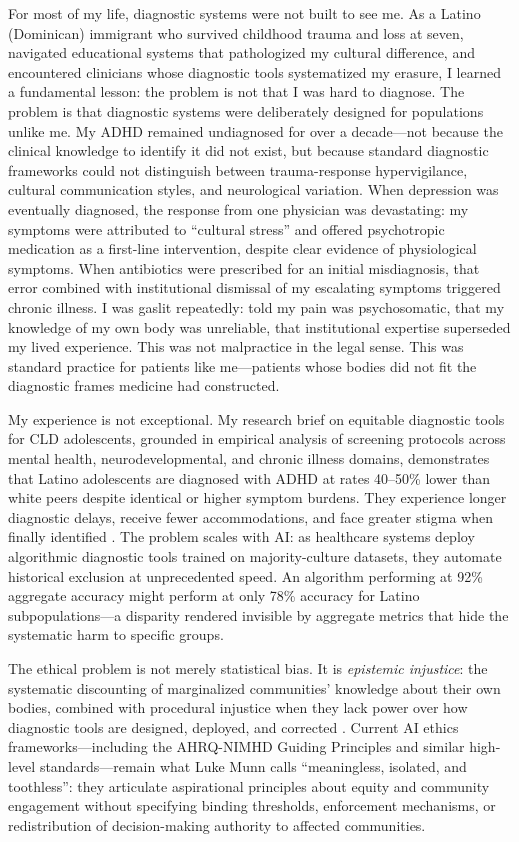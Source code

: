 \documentclass[12pt,a4paper]{article}
\begin{document}
\noindent For most of my life, diagnostic systems were not built to see me. As a Latino (Dominican) immigrant who survived childhood trauma and loss at seven, navigated educational systems that pathologized my cultural difference, and encountered clinicians whose diagnostic tools systematized my erasure, I learned a fundamental lesson: the problem is not that I was hard to diagnose. The problem is that diagnostic systems were deliberately designed for populations unlike me. My ADHD remained undiagnosed for over a decade—not because the clinical knowledge to identify it did not exist, but because standard diagnostic frameworks could not distinguish between trauma-response hypervigilance, cultural communication styles, and neurological variation. When depression was eventually diagnosed, the response from one physician was devastating: my symptoms were attributed to ``cultural stress'' and offered psychotropic medication as a first-line intervention, despite clear evidence of physiological symptoms. When antibiotics were prescribed for an initial misdiagnosis, that error combined with institutional dismissal of my escalating symptoms triggered chronic illness. I was gaslit repeatedly: told my pain was psychosomatic, that my knowledge of my own body was unreliable, that institutional expertise superseded my lived experience. This was not malpractice in the legal sense. This was standard practice for patients like me—patients whose bodies did not fit the diagnostic frames medicine had constructed.

My experience is not exceptional. My research brief on equitable diagnostic tools for CLD adolescents, grounded in empirical analysis of screening protocols across mental health, neurodevelopmental, and chronic illness domains, demonstrates that Latino adolescents are diagnosed with ADHD at rates 40--50\% lower than white peers despite identical or higher symptom burdens. They experience longer diagnostic delays, receive fewer accommodations, and face greater stigma when finally identified \citep{Marko2025}. The problem scales with AI: as healthcare systems deploy algorithmic diagnostic tools trained on majority-culture datasets, they automate historical exclusion at unprecedented speed. An algorithm performing at 92\% aggregate accuracy might perform at only 78\% accuracy for Latino subpopulations—a disparity rendered invisible by aggregate metrics that hide the systematic harm to specific groups.

The ethical problem is not merely statistical bias. It is \textit{epistemic injustice}: the systematic discounting of marginalized communities' knowledge about their own bodies, combined with procedural injustice when they lack power over how diagnostic tools are designed, deployed, and corrected \citep{Nadarzynski2024}. Current AI ethics frameworks—including the AHRQ-NIMHD Guiding Principles and similar high-level standards—remain what Luke Munn calls ``meaningless, isolated, and toothless'': they articulate aspirational principles about equity and community engagement without specifying binding thresholds, enforcement mechanisms, or redistribution of decision-making authority to affected communities.
\end{document}
